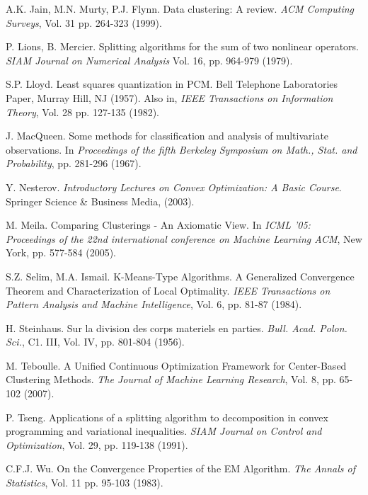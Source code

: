\documentclass[12pt,a4paper]{report}
\begin{document}
\begin{thebibliography}{99}
 A.K. Jain, M.N. Murty, P.J. Flynn. Data clustering: A review. \emph{ACM Computing Surveys}, Vol. 31 pp. 264-323 (1999).


 P. Lions, B. Mercier. Splitting algorithms for the sum of two nonlinear operators. \emph{SIAM Journal on Numerical Analysis} Vol. 16, pp. 964-979 (1979).


 S.P. Lloyd. Least squares quantization in PCM. Bell Telephone Laboratories Paper, Murray Hill, NJ (1957). Also in, \emph{IEEE Transactions on Information Theory}, Vol. 28 pp. 127-135 (1982).


 J. MacQueen. Some methods for classification and analysis of multivariate observations. In \emph{Proceedings of the fifth Berkeley Symposium on Math., Stat. and Probability}, pp. 281-296 (1967).


 Y. Nesterov. \emph{Introductory Lectures on Convex Optimization: A Basic Course}. Springer Science \& Business Media, (2003).


 M. Meila. Comparing Clusterings - An Axiomatic View. In \emph{ICML '05: Proceedings of the 22nd international conference on Machine Learning ACM}, New York, pp. 577-584 (2005).


 S.Z. Selim,  M.A. Ismail. K-Means-Type Algorithms. A Generalized Convergence Theorem and Characterization of Local Optimality. \emph{IEEE Transactions on Pattern Analysis and Machine Intelligence}, Vol. 6, pp. 81-87 (1984).


 H. Steinhaus. Sur la division des corps materiels en parties. \emph{Bull. Acad. Polon. Sci.}, C1. III, Vol. IV, pp. 801-804 (1956). 


 M. Teboulle. A Unified Continuous Optimization Framework for Center-Based Clustering Methods. \emph{The Journal of Machine Learning Research}, Vol. 8, pp. 65-102 (2007).


 P. Tseng. Applications of a splitting algorithm to decomposition in convex programming and variational inequalities. \emph{SIAM Journal on Control and Optimization}, Vol. 29, pp. 119-138 (1991).


  C.F.J. Wu. On the Convergence Properties of the EM Algorithm. \emph{The Annals of Statistics}, Vol. 11 pp. 95-103 (1983).

\end{thebibliography}
\end{document}
